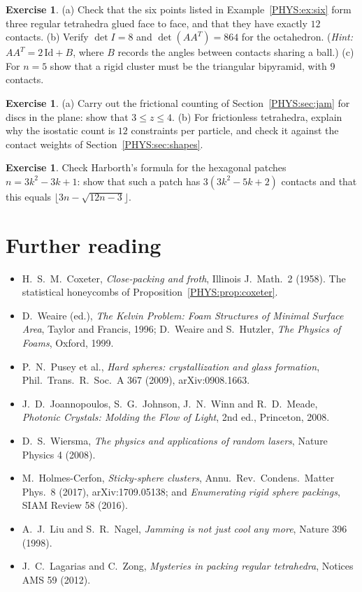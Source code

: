 \documentclass[11pt,openany]{book}
\theoremstyle{plain}
\theoremstyle{definition}
\newtheorem{exercise}[theorem]{Exercise}
\theoremstyle{remark}
\begin{document}
\begin{exercise}
(a) Check that the six points listed in Example~\ref{PHYS:ex:six} form three regular tetrahedra glued face to face,
and that they have exactly $12$ contacts. (b) Verify $\det I=8$ and $\det(AA^T)=864$ for the octahedron.
(\emph{Hint:} $AA^T=2\,\mathrm{Id}+B$, where $B$ records the angles between contacts sharing a ball.) (c) For $n=5$
show that a rigid cluster must be the triangular bipyramid, with $9$ contacts.
\end{exercise}

\begin{exercise}
(a) Carry out the frictional counting of Section~\ref{PHYS:sec:jam} for discs in the plane: show that
$3\le z\le4$. (b) For frictionless tetrahedra, explain why the
isostatic count is $12$ constraints per particle, and check it against the contact weights of
Section~\ref{PHYS:sec:shapes}.
\end{exercise}

\begin{exercise}
Check Harborth's formula for the hexagonal patches $n=3k^2-3k+1$: show that such a patch has $3(3k^2-5k+2)$
contacts and that this equals $\lfloor3n-\sqrt{12n-3}\rfloor$.
\end{exercise}

\section*{Further reading}
\begin{itemize}[nosep]
\item H.~S.~M.~Coxeter, \emph{Close-packing and froth}, Illinois J.\ Math.\ 2 (1958). The statistical honeycombs of
  Proposition~\ref{PHYS:prop:coxeter}.
\item D.~Weaire (ed.), \emph{The Kelvin Problem: Foam Structures of Minimal Surface Area}, Taylor and Francis, 1996;
  D.~Weaire and S.~Hutzler, \emph{The Physics of Foams}, Oxford, 1999.
\item P.~N.~Pusey et al., \emph{Hard spheres: crystallization and glass formation}, Phil.\ Trans.\ R.\ Soc.\ A 367
  (2009), arXiv:0908.1663.
\item J.~D.~Joannopoulos, S.~G.~Johnson, J.~N.~Winn and R.~D.~Meade, \emph{Photonic Crystals: Molding the Flow of
  Light}, 2nd ed., Princeton, 2008.
\item D.~S.~Wiersma, \emph{The physics and applications of random lasers}, Nature Physics 4 (2008).
\item M.~Holmes-Cerfon, \emph{Sticky-sphere clusters}, Annu.\ Rev.\ Condens.\ Matter Phys.\ 8 (2017),
  arXiv:1709.05138; and \emph{Enumerating rigid sphere packings}, SIAM Review 58 (2016).
\item A.~J.~Liu and S.~R.~Nagel, \emph{Jamming is not just cool any more}, Nature 396 (1998).
\item J.~C.~Lagarias and C.~Zong, \emph{Mysteries in packing regular tetrahedra}, Notices AMS 59 (2012).
\end{itemize}
\endgroup
\end{document}

